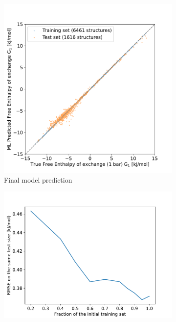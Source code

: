 \documentclass[main]{subfiles}
\begin{document}
\begin{figure}[ht]
\centering
  \begin{subfigure}[b]{0.48\textwidth}
  \centering
    \includegraphics[width=\textwidth]{figures/4-ml/main/Scatterplot_G1_prediction.pdf}
    \caption{Final model prediction}\label{fgr:G1_prediction}
  \end{subfigure}
  \begin{subfigure}[b]{0.48\textwidth}
  \centering
    \includegraphics[width=\textwidth]{figures/4-ml/main/training_curve.pdf}

\end{subfigure}
\end{figure}
\end{document}
